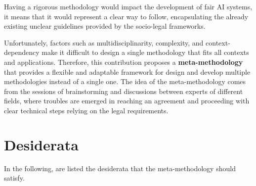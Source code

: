 \documentclass[12pt,a4paper,openright,twoside]{book}
\begin{document}
Having a rigorous methodology would impact the development of fair \ac{AI} systems, it means that it would represent a clear way to follow, encapsulating the already existing unclear guidelines provided by the socio-legal frameworks.

Unfortunately, factors such as multidisciplinarity, complexity, and context-dependency make it difficult to design a single methodology that fits all contexts and applications.
%
Therefore, this contribution proposes a \textbf{meta-methodology} that provides a flexible and adaptable framework for design and develop multiple methodologies instead of a single one.
%
The idea of the meta-methodology comes from the sessions of brainstorming and discussions between experts of different fields, where troubles are emerged in reaching an agreement and proceeding with clear technical steps relying on the legal requirements.


\section{Desiderata}
In the following, are listed the desiderata that the meta-methodology should satisfy.
\end{document}
